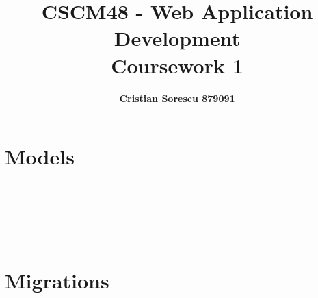 \documentclass[11pt, oneside]{article}   	%
\title{\textbf{CSCM48 - Web Application Development} \\ Coursework 1}
\author{\bf Cristian Sorescu 879091}
\newenvironment{code}{\captionsetup{type=listing}}{}
\begin{document}
\maketitle

\newpage
\tableofcontents
\newpage

\section{Models}

\begin{code}
\label{code:User}
\inputminted[style=xcode, frame=single]{php}{../app/User.php}
\end{code}

\begin{code}
\label{code:Post}
\inputminted[style=xcode, frame=single]{php}{../app/Post.php}
\end{code}

\begin{code}
\label{code:Comment}
\inputminted[style=xcode, frame=single]{php}{../app/Comment.php}
\end{code}

\begin{code}
\label{code:Profile}
\inputminted[style=xcode, frame=single]{php}{../app/Profile.php}
\end{code}

\begin{code}
\label{code:Tag}
\inputminted[style=xcode, frame=single]{php}{../app/Tag.php}
\end{code}

\begin{code}
\label{code:View}
\inputminted[style=xcode, frame=single]{php}{../app/View.php}
\end{code}

\begin{code}
\label{code:Vote}
\inputminted[style=xcode, frame=single]{php}{../app/Vote.php}
\end{code}

\section{Migrations}

\begin{code}
\label{code:create_users_table}
\inputminted[style=xcode, frame=single]{php}{../database/migrations/2014_10_12_000000_create_users_table.php}
\end{code}
\end{document}
